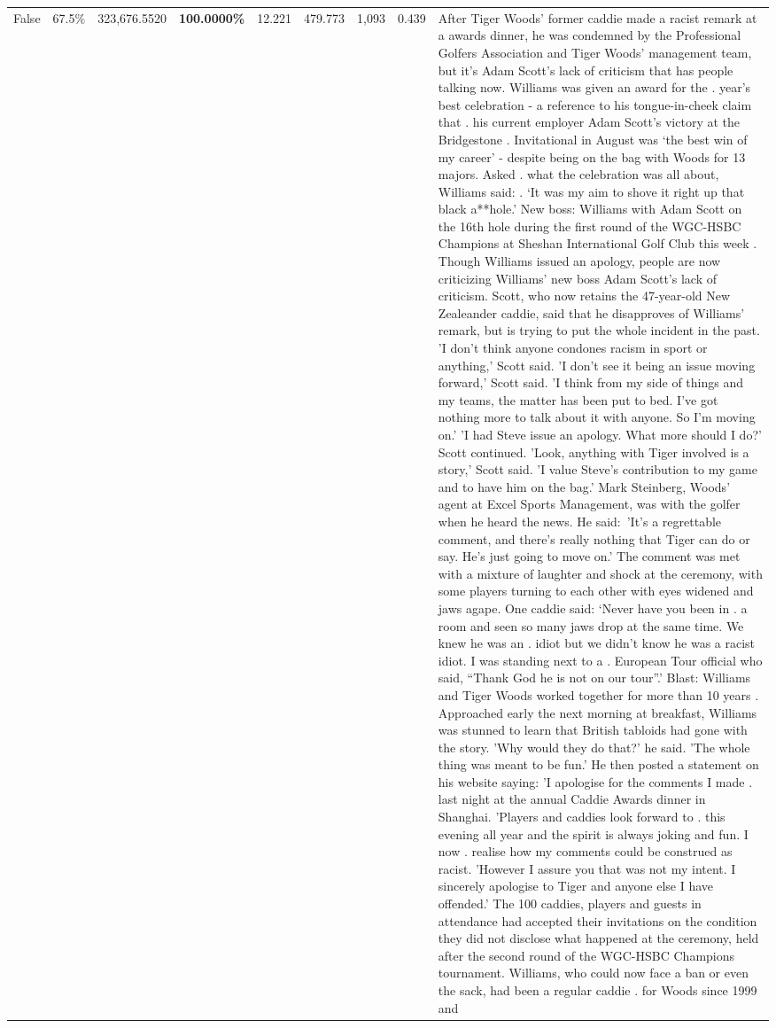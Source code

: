 \begin{table}[H]
\begin{tabular}{lllrlllll}
False & 67.5\% & 323,676.5520 & \bfseries \color{red} 100.0000\% & 12.221 & 479.773 & 1,093 & 0.439 & After Tiger Woods' former caddie made a racist remark at a awards dinner, he was condemned by the Professional Golfers Association and Tiger Woods' management team, but it's Adam Scott's lack of criticism that has people talking now. Williams was given an award for the . year’s best celebration - a reference to his tongue-in-cheek claim that . his current employer Adam Scott’s victory at the Bridgestone . Invitational in August was ‘the best win of my career’ - despite being on the bag with Woods for 13 majors. Asked . what the celebration was all about, Williams said: . ‘It was my aim to shove it right up that black a**hole.’ New boss: Williams with Adam Scott  on the 16th hole during the first round of the WGC-HSBC Champions at Sheshan International Golf Club this week . Though Williams issued an apology, people are now criticizing Williams' new boss Adam Scott's lack of criticism. Scott, who now retains the 47-year-old New Zealeander caddie, said that he disapproves of Williams' remark, but is trying to put the whole incident in the past. 'I don't think anyone condones racism in sport or anything,' Scott said. 'I don't see it being an issue moving forward,' Scott said. 'I think from my side of things and my teams, the matter has been put to bed. I've got nothing more to talk about it with anyone. So I'm moving on.' 'I had Steve issue an apology. What more should I do?' Scott continued. 'Look, anything with Tiger involved is a story,' Scott said. 'I value Steve's contribution to my game and to have him on the bag.' Mark Steinberg, Woods' agent at Excel Sports Management, was with the golfer when he heard the news. He said: 'It's a regrettable comment, and there's really nothing that Tiger can do or say. He's just going to move on.' The comment was met with a mixture of laughter and shock at the ceremony, with some players turning to each other with eyes widened and jaws agape. One caddie said: ‘Never have you been in . a room and seen so many jaws drop at the same time. We knew he was an . idiot but we didn’t know he was a racist idiot. I was standing next to a . European Tour official who said, “Thank God he is not on our tour”.’ Blast: Williams and Tiger Woods worked together for more than 10 years . Approached early the next morning at breakfast, Williams was stunned to learn that British tabloids had gone with the story. 'Why would they do that?' he said. 'The whole thing was meant to be fun.' He then posted a statement on his website saying: 'I apologise for the comments I made . last night at the annual Caddie Awards dinner in Shanghai. 'Players and caddies look forward to . this evening all year and the spirit is always joking and fun. I now . realise how my comments could be construed as racist. 'However I assure you that was not my intent. I sincerely apologise to Tiger and anyone else I have offended.' The 100 caddies, players and guests in attendance had accepted their invitations on the condition they did not disclose what happened at the ceremony, held after the second round of the WGC-HSBC Champions tournament. Williams, who could now face a ban or even the sack, had been a regular caddie . for Woods since 1999 and 
\end{tabular}
\end{table}
